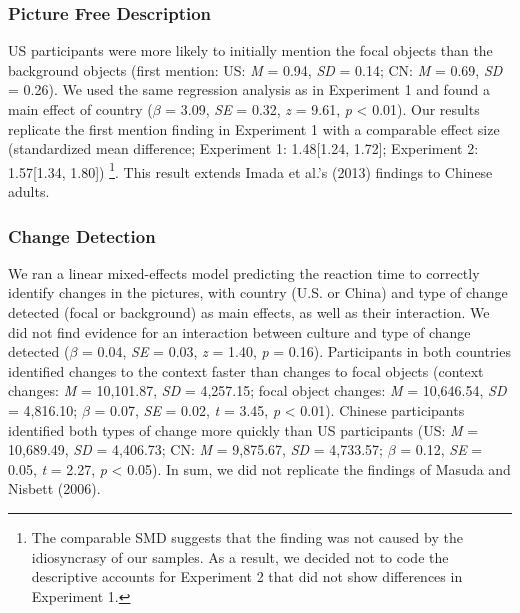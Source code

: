\documentclass[
  man,floatsintext]{apa6}
\begin{document}
\hypertarget{picture-free-description-2}{%
\subsubsection{Picture Free Description}\label{picture-free-description-2}}

US participants were more likely to initially mention the focal objects than the background objects (first mention: US: \emph{M} = 0.94, \emph{SD} = 0.14; CN: \emph{M} = 0.69, \emph{SD} = 0.26). We used the same regression analysis as in Experiment 1 and found a main effect of country (\(\beta\) = 3.09, \emph{SE} = 0.32, \emph{z} = 9.61, \emph{p} \textless{} 0.01). Our results replicate the first mention finding in Experiment 1 with a comparable effect size (standardized mean difference; Experiment 1: 1.48{[}1.24, 1.72{]}; Experiment 2: 1.57{[}1.34, 1.80{]}) \footnote{The comparable SMD suggests that the finding was not caused by the idiosyncrasy of our samples. As a result, we decided not to code the descriptive accounts for Experiment 2 that did not show differences in Experiment 1.}. This result extends Imada et al.'s (2013) findings to Chinese adults.

\hypertarget{change-detection-1}{%
\subsubsection{Change Detection}\label{change-detection-1}}

We ran a linear mixed-effects model predicting the reaction time to correctly identify changes in the pictures, with country (U.S. or China) and type of change detected (focal or background) as main effects, as well as their interaction. We did not find evidence for an interaction between culture and type of change detected (\(\beta\) = 0.04, \emph{SE} = 0.03, \emph{z} = 1.40, \emph{p} = 0.16). Participants in both countries identified changes to the context faster than changes to focal objects (context changes: \emph{M} = 10,101.87, \emph{SD} = 4,257.15; focal object changes: \emph{M} = 10,646.54, \emph{SD} = 4,816.10; \(\beta\) = 0.07, \emph{SE} = 0.02, \emph{t} = 3.45, \emph{p} \textless{} 0.01). Chinese participants identified both types of change more quickly than US participants (US: \emph{M} = 10,689.49, \emph{SD} = 4,406.73; CN: \emph{M} = 9,875.67, \emph{SD} = 4,733.57; \(\beta\) = 0.12, \emph{SE} = 0.05, \emph{t} = 2.27, \emph{p} \textless{} 0.05). In sum, we did not replicate the findings of Masuda and Nisbett (2006).
\end{document}
